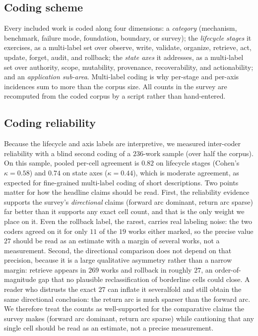 \subsection{Coding scheme}

Every included work is coded along four dimensions: a \emph{category} (mechanism,
benchmark, failure mode, foundation, boundary, or survey); the \emph{lifecycle
stages} it exercises, as a multi-label set over observe, write, validate,
organize, retrieve, act, update, forget, audit, and rollback; the \emph{state
axes} it addresses, as a multi-label set over authority, scope, mutability,
provenance, recoverability, and actionability; and an \emph{application sub-area}.
Multi-label coding is why per-stage and per-axis incidences sum to more than the
corpus size. All counts in the survey are recomputed from the coded corpus by a
script rather than hand-entered.

\subsection{Coding reliability}

Because the lifecycle and axis labels are interpretive, we measured inter-coder
reliability with a blind second coding of a $236$-work sample (over half the
corpus). On this sample, pooled per-cell agreement is $0.82$ on lifecycle stages
(Cohen's $\kappa = 0.58$) and $0.74$ on state axes ($\kappa = 0.44$), which is
moderate agreement, as expected for fine-grained multi-label coding of short
descriptions. Two points matter for how the headline claims should be read.
First, the reliability evidence supports the survey's \emph{directional} claims
(forward arc dominant, return arc sparse) far better than it supports any exact
cell count, and that is the only weight we place on it. Even the rollback label,
the rarest, carries real labeling noise: the two coders agreed on it for only
$11$ of the $19$ works either marked, so the precise value $27$ should be read as
an estimate with a margin of several works, not a measurement. Second, the
directional comparison does not depend on that precision, because it is a large
qualitative asymmetry rather than a narrow margin: retrieve appears in
$269$ works and rollback in roughly $27$, an order-of-magnitude gap that no
plausible reclassification of borderline cells could close. A reader who
distrusts the exact $27$ can inflate it severalfold and still obtain the same
directional conclusion: the return arc is much sparser than the forward arc. We
therefore treat the counts as well-supported for the comparative claims the
survey makes (forward arc dominant, return arc sparse) while cautioning that any
single cell
should be read as an estimate, not a precise measurement.

